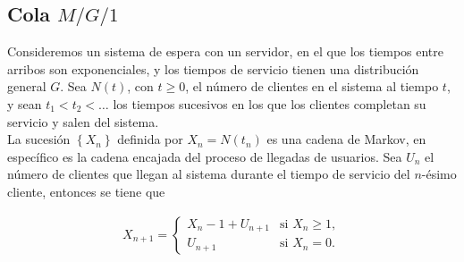 \documentclass{article}
\numberwithin{equation}{section}
\begin{document}
\subsection*{Cola $M/G/1$}

Consideremos un sistema de espera con un servidor, en el que los tiempos entre arribos son exponenciales, y los tiempos de servicio tienen una distribuci\'on general $G$. Sea $N\left(t\right)$, con $t\geq0$, el n\'umero de clientes en el sistema al tiempo $t$, y sean $t_{1}<t_{2}<\dots$ los tiempos sucesivos en los que los clientes completan su servicio y salen del sistema.\\

La sucesi\'on $\left\{X_{n}\right\}$ definida por
$X_{n}=N\left(t_{n}\right)$ es una cadena de Markov, en espec\'ifico es la cadena encajada del proceso de llegadas de usuarios. Sea $U_{n}$ el n\'umero de clientes que llegan al sistema durante el tiempo de servicio del $n$-\'esimo cliente, entonces se tiene que

\begin{eqnarray}
X_{n+1}=\left\{\begin{array}{cc}
X_{n}-1+U_{n+1} & \textrm{si }X_{n}\geq1,\\
U_{n+1} & \textrm{si }X_{n}=0.
\end{array}\right.
\end{eqnarray}
\end{document}
